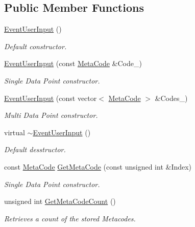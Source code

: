 \subsection*{Public Member Functions}
\begin{DoxyCompactItemize}
\item 
\hyperlink{classphys_1_1EventUserInput_ae7358d184021306da8979000c225845e}{EventUserInput} ()
\begin{DoxyCompactList}\small\item\em Default constructor. \item\end{DoxyCompactList}\item 
\hyperlink{classphys_1_1EventUserInput_af54d4604d18b25a2dc99a4a3090b9f1d}{EventUserInput} (const \hyperlink{classphys_1_1MetaCode}{MetaCode} \&Code\_\-)
\begin{DoxyCompactList}\small\item\em Single Data Point constructor. \item\end{DoxyCompactList}\item 
\hyperlink{classphys_1_1EventUserInput_a56ca671dd5d28396cab0d7036e08a1f1}{EventUserInput} (const vector$<$ \hyperlink{classphys_1_1MetaCode}{MetaCode} $>$ \&Codes\_\-)
\begin{DoxyCompactList}\small\item\em Multi Data Point constructor. \item\end{DoxyCompactList}\item 
virtual \hyperlink{classphys_1_1EventUserInput_a5c4bb6a5016dad4cb32f51cc1d88eac3}{$\sim$EventUserInput} ()
\begin{DoxyCompactList}\small\item\em Default desstructor. \item\end{DoxyCompactList}\item 
const \hyperlink{classphys_1_1MetaCode}{MetaCode} \hyperlink{classphys_1_1EventUserInput_aaf56168b98e339cec74ae862b64632ba}{GetMetaCode} (const unsigned int \&Index)
\begin{DoxyCompactList}\small\item\em Single Data Point constructor. \item\end{DoxyCompactList}\item 
unsigned int \hyperlink{classphys_1_1EventUserInput_a17aa65dcf0ef8689affa50232eec4ccb}{GetMetaCodeCount} ()
\begin{DoxyCompactList}\small\item\em Retrieves a count of the stored Metacodes. \item\end{DoxyCompactList}\item 

\end{DoxyCompactItemize}
